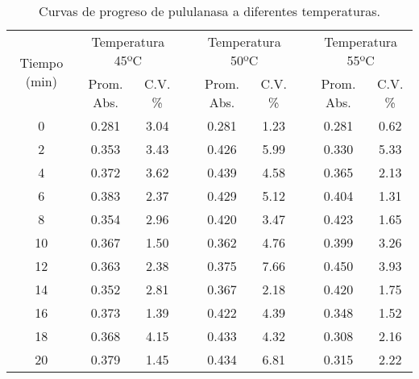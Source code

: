 \documentclass{article}
\begin{document}
\begin{table}[H]
	\centering
	\caption{Curvas de progreso de pululanasa a diferentes temperaturas.}
	\begin{tabular}{ccccccccc}
		\toprule
		\multirow{2}[4]{*}{Tiempo (min)} & \multicolumn{2}{c}{Temperatura 45ºC} &       & \multicolumn{2}{c}{Temperatura 50ºC} &       & \multicolumn{2}{c}{Temperatura 55ºC} \\
		\cmidrule{2-3}\cmidrule{5-6}\cmidrule{8-9}          & Prom. Abs. & C.V. \% &       & Prom. Abs. & C.V. \% &       & Prom. Abs. & C.V. \% \\
		\midrule
		0     & 0.281 & 3.04  &       & 0.281 & 1.23  &       & 0.281 & 0.62 \\
		2     & 0.353 & 3.43  &       & 0.426 & 5.99  &       & 0.330 & 5.33 \\
		4     & 0.372 & 3.62  &       & 0.439 & 4.58  &       & 0.365 & 2.13 \\
		6     & 0.383 & 2.37  &       & 0.429 & 5.12  &       & 0.404 & 1.31 \\
		8     & 0.354 & 2.96  &       & 0.420 & 3.47  &       & 0.423 & 1.65 \\
		10    & 0.367 & 1.50  &       & 0.362 & 4.76  &       & 0.399 & 3.26 \\
		12    & 0.363 & 2.38  &       & 0.375 & 7.66  &       & 0.450 & 3.93 \\
		14    & 0.352 & 2.81  &       & 0.367 & 2.18  &       & 0.420 & 1.75 \\
		16    & 0.373 & 1.39  &       & 0.422 & 4.39  &       & 0.348 & 1.52 \\
		18    & 0.368 & 4.15  &       & 0.433 & 4.32  &       & 0.308 & 2.16 \\
		20    & 0.379 & 1.45  &       & 0.434 & 6.81  &       & 0.315 & 2.22 \\
		\bottomrule
	\end{tabular}%
	\label{tab:b2}%
\end{table}%
\end{document}
